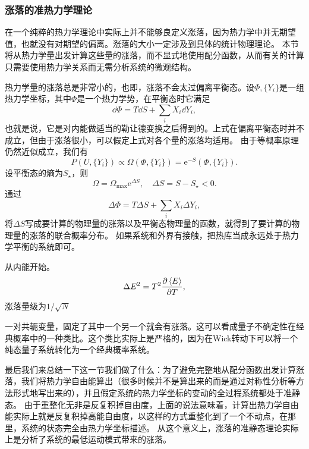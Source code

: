 \documentclass[hyperref, UTF8, a4paper]{ctexart}
\newcommand*{\ee}{\mathrm{e}}
\begin{document}
\subsubsection{涨落的准热力学理论}

在一个纯粹的热力学理论中实际上并不能够良定义涨落，因为热力学中并无期望值，也就没有对期望的偏离。涨落的大小一定涉及到具体的统计物理理论。
本节将从热力学量出发计算这些量的涨落，而不显式地使用配分函数，从而有关的计算只需要使用热力学关系而无需分析系统的微观结构。

热力学量的涨落总是非常小的，也即，涨落不会太过偏离平衡态。设$\Phi, \{Y_i\}$是一组热力学坐标，其中$\Phi$是一个热力学势，在平衡态时它满足
\[
    \dd{\Phi} = T \dd{S} + \sum_i X_i \dd{Y_i}, 
\]
也就是说，它是对内能做适当的勒让德变换之后得到的。上式在偏离平衡态时并不成立，但由于涨落很小，可以假定上式对各个量的涨落均适用。
由于等概率原理仍然近似成立，我们有
\[
    P(U, \{Y_i\}) \propto \Omega(\Phi, \{Y_i\}) = \ee^{-S}(\Phi, \{Y_i\}).
\]
设平衡态的熵为$S_\star$，则
\begin{equation}
    \Omega = \Omega_\text{max} \ee^{\Delta S}, \quad \Delta S = S - S_\star < 0.
\end{equation}
通过
\[
    \Delta{\Phi} = T \Delta{S} + \sum_i X_i \Delta{Y_i},
\]
将$\Delta S$写成要计算的物理量的涨落以及平衡态物理量的函数，就得到了要计算的物理量的涨落的联合概率分布。
如果系统和外界有接触，把热库当成永远处于热力学平衡的系统即可。

从内能开始。
\begin{equation}
    \Delta E^2 = T^2 \pdv{\expval*{E}}{T},
\end{equation}
涨落量级为$1/\sqrt{N}$

一对共轭变量，固定了其中一个另一个就会有涨落。这可以看成量子不确定性在经典概率中的一种类比。这个类比实际上是严格的，因为在Wick转动下可以将一个纯态量子系统转化为一个经典概率系统。

最后我们来总结一下这一节我们做了什么：为了避免完整地从配分函数出发计算涨落，我们将热力学自由能算出（很多时候并不是算出来的而是通过对称性分析等方法形式地写出来的），并且假定系统的热力学坐标的变动的全过程系统都处于准静态。
由于重整化无非是反复积掉自由度，上面的说法意味着，计算出热力学自由能实际上就是反复积掉高能自由度，以这样的方式重整化到了一个不动点，在那里，系统的状态完全由热力学坐标描述。
从这个意义上，涨落的准静态理论实际上是分析了系统的最低运动模式带来的涨落。
\end{document}
